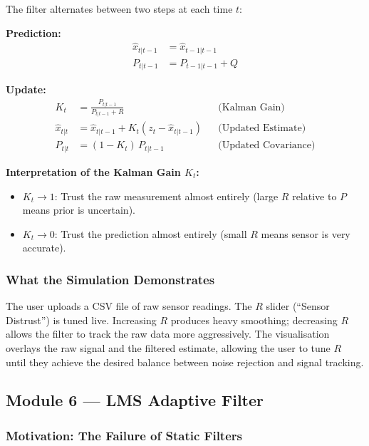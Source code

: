 \documentclass[12pt, a4paper]{article}
\begin{document}
The filter alternates between two steps at each time $t$:

\textbf{Prediction:}
\begin{align}
  \hat{x}_{t|t-1} &= \hat{x}_{t-1|t-1} \\
  P_{t|t-1}       &= P_{t-1|t-1} + Q
\end{align}

\textbf{Update:}
\begin{align}
  K_t             &= \frac{P_{t|t-1}}{P_{t|t-1} + R}              && \text{(Kalman Gain)} \\
  \hat{x}_{t|t}   &= \hat{x}_{t|t-1} + K_t(z_t - \hat{x}_{t|t-1}) && \text{(Updated Estimate)} \\
  P_{t|t}         &= (1 - K_t)\, P_{t|t-1}                         && \text{(Updated Covariance)}
\end{align}

\textbf{Interpretation of the Kalman Gain $K_t$:}
\begin{itemize}
  \item $K_t \to 1$: Trust the raw measurement almost entirely (large $R$ relative
        to $P$ means prior is uncertain).
  \item $K_t \to 0$: Trust the prediction almost entirely (small $R$ means sensor
        is very accurate).
\end{itemize}

\subsubsection{What the Simulation Demonstrates}

The user uploads a CSV file of raw sensor readings. The $R$ slider (``Sensor
Distrust'') is tuned live. Increasing $R$ produces heavy smoothing; decreasing $R$
allows the filter to track the raw data more aggressively. The visualisation overlays
the raw signal and the filtered estimate, allowing the user to tune $R$ until they
achieve the desired balance between noise rejection and signal tracking.

\subsection{Module 6 --- LMS Adaptive Filter}

\subsubsection{Motivation: The Failure of Static Filters}
\end{document}

